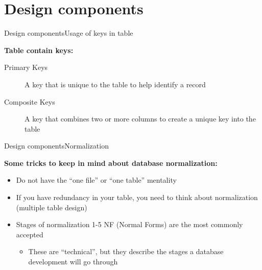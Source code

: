 \documentclass{eecslides}
\begin{document}


\section{Design components}

\begin{frame}{Design components}{Usage of keys in table}

\alert{\textbf{Table contain keys:}}
		 \begin{description}
			 \item [Primary Keys] A key that is unique to the table to help identify a record
			\item [Composite Keys] A key that combines two or more columns to create a unique key into the table
		\end{description}

\end{frame}


\begin{frame}{Design components}{Normalization}

\textbf{Some tricks to keep in mind about database normalization:}

		\begin{itemize}
			\item Do not have the “one file” or “one table” mentality
			\item If you have redundancy in your table, you need to think about normalization (multiple table design)
			\item Stages of normalization 1-5 NF (Normal Forms) are the most commonly accepted
			\begin{itemize}
				\item These are “technical”, but they describe the stages a database development will go through
			\end{itemize}
		\end{itemize}

\end{frame}
\end{document}

